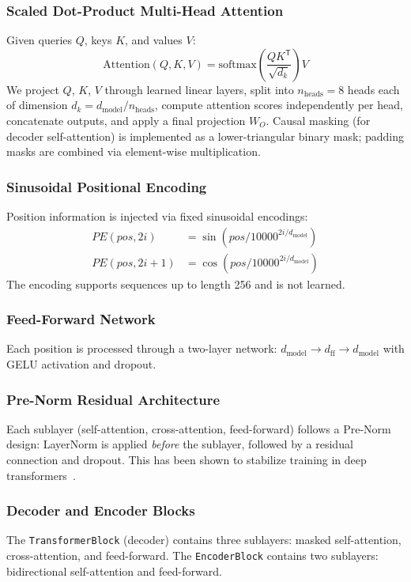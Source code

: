 \documentclass[11pt,a4paper]{article}
\begin{document}
\subsubsection*{Scaled Dot-Product Multi-Head Attention}
Given queries \(Q\), keys \(K\), and values \(V\):
\[
\text{Attention}(Q,K,V) =
    \text{softmax}\!\left(\frac{QK^{\mathsf{T}}}{\sqrt{d_k}}\right)V
\]
We project \(Q\), \(K\), \(V\) through learned linear layers, split into
\(n_{\text{heads}}=8\) heads each of dimension
\(d_k = d_{\text{model}} / n_{\text{heads}}\), compute attention scores
independently per head, concatenate outputs, and apply a final projection
\(W_O\).
Causal masking (for decoder self-attention) is implemented as a
lower-triangular binary mask; padding masks are combined via element-wise
multiplication.

\subsubsection*{Sinusoidal Positional Encoding}
Position information is injected via fixed sinusoidal encodings:
\[
\begin{aligned}
PE(pos, 2i)   &= \sin\!\left(pos / 10000^{2i/d_{\text{model}}}\right) \\
PE(pos, 2i+1) &= \cos\!\left(pos / 10000^{2i/d_{\text{model}}}\right)
\end{aligned}
\]
The encoding supports sequences up to length 256 and is not learned.

\subsubsection*{Feed-Forward Network}
Each position is processed through a two-layer network:
\(d_{\text{model}} \to d_{\text{ff}} \to d_{\text{model}}\) with GELU
activation and dropout.

\subsubsection*{Pre-Norm Residual Architecture}
Each sublayer (self-attention, cross-attention, feed-forward) follows a
Pre-Norm design: LayerNorm is applied \emph{before} the sublayer, followed
by a residual connection and dropout.
This has been shown to stabilize training in deep
transformers~\cite{xiong2020layer}.

\subsubsection*{Decoder and Encoder Blocks}
The \texttt{TransformerBlock} (decoder) contains three sublayers:
masked self-attention, cross-attention, and feed-forward.
The \texttt{EncoderBlock} contains two sublayers:
bidirectional self-attention and feed-forward.
\end{document}
